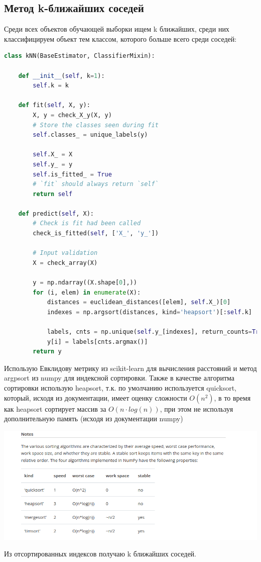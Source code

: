 \subsection{Метод k-ближайших соседей}
Среди всех объектов обучающей выборки ищем k ближайших, среди них классифицируем объект тем классом, которого больше всего среди соседей:
\begin{lstlisting}[language=Python]
class kNN(BaseEstimator, ClassifierMixin):
    
    def __init__(self, k=1):
        self.k = k

    def fit(self, X, y):
        X, y = check_X_y(X, y)
        # Store the classes seen during fit
        self.classes_ = unique_labels(y)

        self.X_ = X
        self.y_ = y
        self.is_fitted_ = True
        # `fit` should always return `self`
        return self

    def predict(self, X):
        # Check is fit had been called
        check_is_fitted(self, ['X_', 'y_'])

        # Input validation
        X = check_array(X)

        y = np.ndarray((X.shape[0],))
        for (i, elem) in enumerate(X):
            distances = euclidean_distances([elem], self.X_)[0]
            indexes = np.argsort(distances, kind='heapsort')[:self.k]

            labels, cnts = np.unique(self.y_[indexes], return_counts=True)
            y[i] = labels[cnts.argmax()]
        return y
\end{lstlisting}
Использую Евклидову метрику из scikit-learn для вычисления расстояний и метод argpsort из numpy \cite{numpy-argsort} для индексной сортировки.
Также в качестве алгоритма сортировки использую heapsort, т.к. по умолчанию используется quicksort, который, исходя из документации, имеет 
оценку сложности $O(n^2)$, в то время как heapsort сортирует массив за $O(n \cdot log(n))$, при этом не используя дополнительную память 
(исходя из документации numpy)
\begin{center}
\includegraphics[scale=0.65]{./images/doc}
\end{center}
Из отсортированных индексов получаю k ближайших соседей.
\pagebreak

